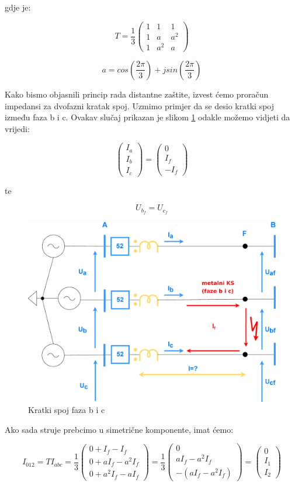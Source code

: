 gdje je:

\[T=\frac{1}{3} \begin{pmatrix} 1 & 1 & 1 \\
1 & a & a^2 \\
1 & a^2 & a \end{pmatrix}\]

\[a=cos(\frac{2\pi}{3})+jsin(\frac{2\pi}{3})\] 

Kako bismo objasnili princip rada distantne zaštite, izvest ćemo proračun impedansi za dvofazni kratak spoj. Uzmimo primjer da se desio kratki spoj između faza b i c. Ovakav slučaj prikazan je slikom \ref{fig:shema3} odakle možemo vidjeti da vrijedi:

\[\begin{pmatrix} I_a \\ I_b \\ I_c \end{pmatrix}=\begin{pmatrix} 0 \\ I_f \\ -I_f \end{pmatrix}\]

te

\[U_{b_{f}}=U_{c_{f}}\]

\begin{figure}[H]
  \centering
  \includegraphics[width=1\textwidth]{shema3}
  \caption{Kratki spoj faza b i c}
  \label{fig:shema3}
\end{figure}

Ako sada struje prebcimo u simetrične komponente, imat ćemo:

\[I_{012}=TI_{abc}=\frac{1}{3} \begin{pmatrix} 0+I_f-I_f \\ 
0+aI_f-a^2I_f \\
0+a^2I_f-aI_f \end{pmatrix}=\frac{1}{3} \begin{pmatrix} 0 \\
aI_f-a^2I_f \\
-(aI_f-a^2I_f) \end{pmatrix}=\begin{pmatrix} 0 \\
I_1 \\
I_2 \end{pmatrix} \]

